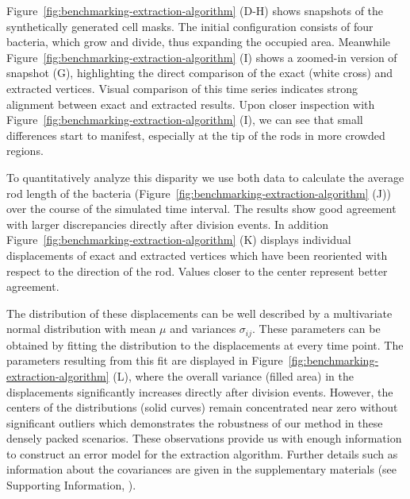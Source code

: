 Figure~\ref{fig:benchmarking-extraction-algorithm} (D-H) shows snapshots of the synthetically
generated cell masks. The initial configuration consists of four bacteria, which grow and divide,
thus expanding the occupied area.
Meanwhile Figure~\ref{fig:benchmarking-extraction-algorithm} (I) shows a zoomed-in version of
snapshot (G), highlighting the direct comparison of the exact (white cross) and extracted vertices.
Visual comparison of this time series indicates strong alignment between exact and extracted
results.
Upon closer inspection with Figure~\ref{fig:benchmarking-extraction-algorithm} (I), we can see
that small differences start to manifest, especially at the tip of the rods in more crowded regions.

To quantitatively analyze this disparity we use both data to calculate the average rod
length of the bacteria (Figure~\ref{fig:benchmarking-extraction-algorithm} (J)) over the course of
the simulated time interval. The results show good agreement with larger discrepancies directly
after division events.
In addition Figure~\ref{fig:benchmarking-extraction-algorithm} (K) displays individual displacements
of exact and extracted vertices which have been reoriented with respect to the direction of the rod.
Values closer to the center represent better agreement.

The distribution of these displacements can be well described by a multivariate normal
distribution with mean $\mu$ and variances $\sigma_{ij}$.
These parameters can be obtained by fitting the distribution to the displacements at every time
point.
The parameters resulting from this fit are displayed in
Figure~\ref{fig:benchmarking-extraction-algorithm} (L), where the overall variance (filled area) in
the displacements significantly increases directly after division events.
However, the centers of the distributions (solid curves) remain concentrated near zero without
significant outliers which demonstrates the robustness of our method in these densely packed
scenarios.
These observations provide us with enough information to construct an error model for the extraction
algorithm.
Further details such as information about the covariances are given in the supplementary materials
(see Supporting Information, ).


